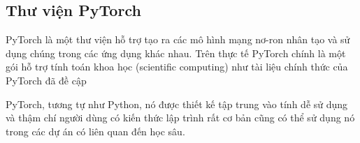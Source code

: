 \subsection{Thư viện PyTorch}

PyTorch là một thư viện hỗ trợ tạo ra các mô hình mạng nơ-ron nhân tạo và sử
dụng chúng trong các ứng dụng khác nhau. Trên thực tế PyTorch chính là một
gói hỗ trợ tính toán khoa học (scientific computing) như tài liệu chính
thức của PyTorch đã đề cập

PyTorch, tương tự như Python, nó được thiết kế tập trung vào tính dễ
sử dụng và thậm chí người dùng có kiến thức lập trình rất cơ bản cũng có thể
sử dụng nó trong các dự án có liên quan đến học sâu.



